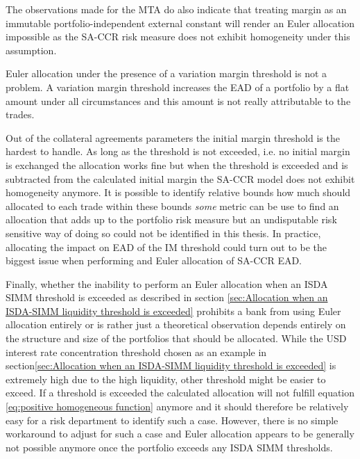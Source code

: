 \documentclass[../Thesis_AHoecherl.tex]{subfiles}
\begin{document}
    The observations made for the \gls{MTA} do also indicate that treating margin as an immutable portfolio-independent external constant will render an Euler allocation impossible as the \gls{SA-CCR} risk measure does not exhibit homogeneity under this assumption.

    Euler allocation under the presence of a variation margin threshold is not a problem.
    A variation margin threshold increases the \gls{EAD} of a portfolio by a flat amount under all circumstances and this amount is not really attributable to the trades.

    Out of the collateral agreements parameters the initial margin threshold is the hardest to handle. As long as the threshold is not exceeded, i.e. no initial margin is exchanged the allocation works fine but when the threshold is exceeded and is subtracted from the calculated initial margin the \gls{SA-CCR} model does not exhibit homogeneity anymore.
    It is possible to identify relative bounds how much should allocated to each trade within these bounds \emph{some} metric can be use to find an allocation that adds up to the portfolio risk measure but an undisputable risk sensitive way of doing so could not be identified in this thesis.
    In practice, allocating the impact on \gls{EAD} of the \gls{IM} threshold could turn out to be the biggest issue when performing and Euler allocation of \gls{SA-CCR} EAD.

    Finally, whether the inability to perform an Euler allocation when an \gls{ISDA SIMM} threshold is exceeded as described in section \ref{sec:Allocation when an ISDA-SIMM liquidity threshold is exceeded} prohibits a bank from using Euler allocation entirely or is rather just a theoretical observation depends entirely on the structure and size of the portfolios that should be allocated.
    While the USD interest rate concentration threshold chosen as an example in section\ref{sec:Allocation when an ISDA-SIMM liquidity threshold is exceeded} is extremely high due to the high liquidity, other threshold might be easier to exceed. If a threshold is exceeded the calculated allocation will not fulfill equation \ref{eq:positive homogeneous function} anymore and it should therefore be relatively easy for a risk department to identify such a case. However, there is no simple workaround to adjust for such a case and Euler allocation appears to be generally not possible anymore once the portfolio exceeds any \gls{ISDA SIMM} thresholds.
\end{document}
